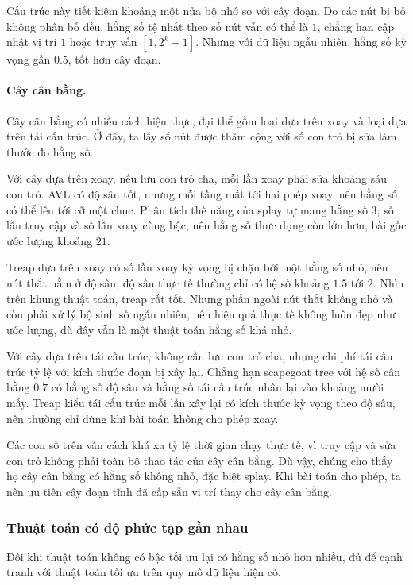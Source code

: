 \documentclass[11pt]{article}
\begin{document}
Cấu trúc này tiết kiệm khoảng một nửa bộ nhớ so với cây đoạn. Do các nút bị bỏ
không phân bố đều, hằng số tệ nhất theo số nút vẫn có thể là \(1\), chẳng hạn
cập nhật vị trí \(1\) hoặc truy vấn \([1,2^k-1]\). Nhưng với dữ liệu ngẫu nhiên,
hằng số kỳ vọng gần \(0.5\), tốt hơn cây đoạn.

\paragraph{Cây cân bằng.}
Cây cân bằng có nhiều cách hiện thực, đại thể gồm loại dựa trên xoay và loại
dựa trên tái cấu trúc. Ở đây, ta lấy số nút được thăm cộng với số con trỏ bị
sửa làm thước đo hằng số.

Với cây dựa trên xoay, nếu lưu con trỏ cha, mỗi lần xoay phải sửa khoảng sáu
con trỏ. AVL có độ sâu tốt, nhưng mỗi tầng mất tới hai phép xoay, nên hằng số
có thể lên tới cỡ một chục. Phân tích thế năng của splay tự mang hằng số \(3\);
số lần truy cập và số lần xoay cùng bậc, nên hằng số thực dụng còn lớn hơn, bài
gốc ước lượng khoảng \(21\).

Treap dựa trên xoay có số lần xoay kỳ vọng bị chặn bởi một hằng số nhỏ, nên nút
thắt nằm ở độ sâu; độ sâu thực tế thường chỉ có hệ số khoảng \(1.5\) tới \(2\).
Nhìn trên khung thuật toán, treap rất tốt. Nhưng phần ngoài nút thắt không nhỏ
và còn phải xử lý bộ sinh số ngẫu nhiên, nên hiệu quả thực tế không luôn đẹp
như ước lượng, dù đây vẫn là một thuật toán hằng số khá nhỏ.

Với cây dựa trên tái cấu trúc, không cần lưu con trỏ cha, nhưng chi phí tái cấu
trúc tỷ lệ với kích thước đoạn bị xây lại. Chẳng hạn scapegoat tree với hệ số
cân bằng \(0.7\) có hằng số độ sâu và hằng số tái cấu trúc nhân lại vào khoảng
mười mấy. Treap kiểu tái cấu trúc mỗi lần xây lại có kích thước kỳ vọng theo
độ sâu, nên thường chỉ dùng khi bài toán không cho phép xoay.

Các con số trên vẫn cách khá xa tỷ lệ thời gian chạy thực tế, vì truy cập và
sửa con trỏ không phải toàn bộ thao tác của cây cân bằng. Dù vậy, chúng cho thấy
họ cây cân bằng có hằng số không nhỏ, đặc biệt splay. Khi bài toán cho phép, ta
nên ưu tiên cây đoạn tĩnh đã cấp sẵn vị trí thay cho cây cân bằng.

\subsubsection{Thuật toán có độ phức tạp gần nhau}

Đôi khi thuật toán không có bậc tối ưu lại có hằng số nhỏ hơn nhiều, đủ để cạnh
tranh với thuật toán tối ưu trên quy mô dữ liệu hiện có.
\end{document}
